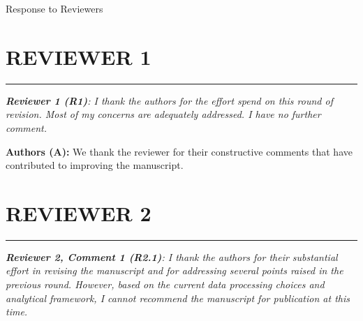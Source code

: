 \documentclass[12pt,a4paper,oneside, reqno]{amsart}
\begin{document}
\newpage

\thispagestyle{empty}


\mbox{}

\vspace{1pt}

\begin{flushright}


{\large Response to Reviewers}

\end{flushright}

\vspace{15pt}


\vspace{10pt}

\section*{\textbf{REVIEWER 1}}
\vspace{-16pt}
\begin{center}
    \rule{\textwidth}{.1pt}
\end{center}

\vspace{5pt}

\setlength{\leftskip}{0cm} \textit{\textbf{Reviewer 1 (R1)}: I thank the authors for the effort spend on this round of revision. Most of my concerns are adequately addressed. I have no further comment.}

\setlength{\leftskip}{1cm}\textbf{Authors (A):} We thank the reviewer for their constructive comments that have contributed to improving the manuscript.

\vspace{10pt}

\section*{\textbf{REVIEWER 2}}
\setlength{\leftskip}{0cm} 
\vspace{-16pt}
\begin{center}
    \rule{\textwidth}{.1pt}
\end{center}

\vspace{5pt}

\setlength{\leftskip}{0cm} \textit{\textbf{Reviewer 2, Comment 1 (R2.1)}: I thank the authors for their substantial effort in revising the manuscript and for addressing several points raised in the previous round. However, based on the current data processing choices and analytical framework, I cannot recommend the manuscript for publication at this time.}
\end{document}
